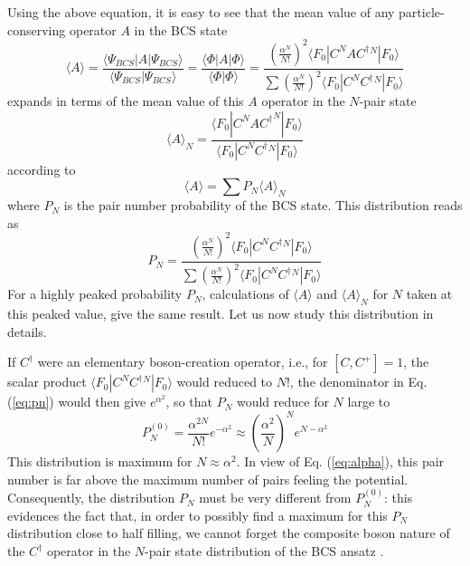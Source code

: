 \documentclass[aps,prb,preprint,groupedaddress,amsmath]{revtex4-1}
\newcommand{\dg}{\ensuremath{\dagger}}
\begin{document}
Using the above equation, it is easy to see that the mean value of any particle-conserving operator $A$ in the BCS state
\begin{equation}
\langle{A}\rangle=\frac{\langle\Psi_{BCS}|A|\Psi_{BCS}{\rangle}}
{\langle\Psi_{BCS}|\Psi_{BCS}{\rangle}}=\frac{\langle\Phi|A|\Phi{\rangle}}
{\langle\Phi|\Phi{\rangle}}=\frac{\left(\frac{\alpha^N}{N!}\right)^2\langle{}F_0|{C}^NA{C^\dg}{}^N|F_0{\rangle}}
{\sum{\left(\frac{\alpha^{N}}{N!}\right)^2\langle{}F_0|{C}^N{C^\dg}{}^N|F_0\rangle}}
\end{equation}
 expands in terms of the mean value of this $A$ operator in the $N$-pair state
\begin{equation}
\langle{A}\rangle_N=\frac{\langle{}F_0|C^NA{C^\dg}^N|F_0{\rangle}}
{\langle{}F_0|{C}^N{{C}^\dg}{} ^N|F_0{\rangle}}\end{equation}
according to 
\begin{equation}
\langle{A}\rangle=\sum{P_N}\langle{A}\rangle_N
\end{equation}
where $P_N$ is the pair number probability of the BCS state. This distribution reads as 
\begin{equation}\label{eq:pn}
P_N=\frac{\left(\frac{\alpha^{N}}{N!}\right)^2\langle{}F_0|{C}^N{C^\dg}{}^N|F_0{\rangle}}
{\sum{\left(\frac{\alpha^{N}}{N!}\right)^2\langle{}F_0|{C}^N{C^\dg}{}^N|F_0\rangle}}
\end{equation} 
For a highly peaked probability $P_N$, calculations of $\langle{A}\rangle$ and $\langle{A}\rangle_N$ for $N$ taken at this peaked value, give the same result. Let us now study this distribution in details. 

If $C^\dg$ were an elementary boson-creation operator, i.e., for $[{C},{C}^+]=1$, the scalar product $\langle{}F_0|{C}^N{C^\dg}{}^N|F_0{\rangle}$ would reduced to $N!$, the denominator in Eq.(\ref{eq:pn}) would then give $e^{\alpha^2}$, so that $P_N$ would reduce for $N$ large to 
\begin{equation}
 P_N^{(0)}=\frac{\alpha^{2N}}{N!}e^{-\alpha^2}\approx\left(\frac{\alpha^2}{N}\right)^Ne^{N-\alpha^2}
\end{equation}
This distribution is maximum for $N\approx\alpha^2$. In view of  Eq. (\ref{eq:alpha}), this pair number is far above the maximum number of pairs feeling the potential. Consequently, the distribution $P_N$ must be very different from $P_N^{(0)}$: this evidences the fact that, in order to possibly find a maximum for this $P_N$ distribution close to half filling, we cannot forget the composite boson nature of the $C^\dg$ operator in the $N$-pair state distribution of the BCS ansatz . 
\end{document}
